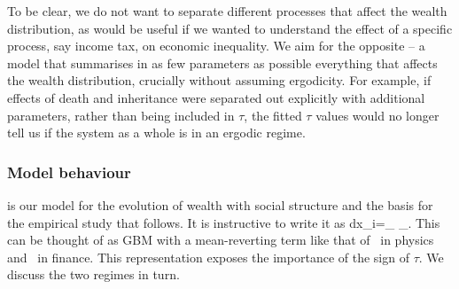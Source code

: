 To be clear, we do not want to separate different processes that affect the wealth distribution, as would be useful if we wanted to understand the effect of a specific process, say income tax, on economic inequality. We aim for the opposite -- a model that summarises in as few parameters as possible everything that affects the wealth distribution, crucially without assuming ergodicity. For example, if effects of death and inheritance were separated out explicitly with additional parameters, rather than being included in $\tau$, the fitted $\tau$ values would no longer tell us if the system as a whole is in an ergodic regime.


\subsubsection{Model behaviour}\label{sec:model_behavior}
 is our model for the evolution of wealth with social structure and the basis for the empirical study that follows. It is instructive to write it as
\be
dx_i=_{} \;\; _{}.
\ee
This can be thought of as GBM with a mean-reverting term like that of~\cite{UhlenbeckOrnstein1930} in physics and~\cite{Vasicek1977} in finance. This representation exposes the importance of the sign of $\tau$. We discuss the two regimes in turn.

